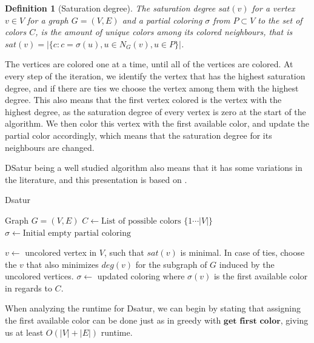 \documentclass[a4paper]{article}
\newtheorem{definition}{Definition}[section]
\begin{document}
\begin{definition}[Saturation degree]{\cite{Constructive}}
    The saturation degree $sat(v)$ for a vertex $v \in V$ for a graph $G =
    (V,E)$ and a partial coloring $\sigma$ from $P \subset V$ to the set of colors $C$, is the amount of unique colors among
    its colored neighbours, that is $sat(v) = |\{c  : c = \sigma(u), u \in N_G(v),u \in P  \}|$.
\end{definition}

The vertices are colored one at a time, until all of the vertices are colored.
At every step of the iteration, we identify the vertex that has the highest
saturation degree, and if there are ties we choose the vertex among them with
the highest degree. This also means that the first vertex colored is the vertex
with the highest degree, as the saturation degree of every vertex is zero at the
start of the algorithm. We then color this vertex with the first available
color, and update the partial color accordingly, which means that the saturation
degree for its neighbours are changed.

DSatur being a well studied
algorithm also means that it has some variations in the literature, and this
presentation is based on \cite{Constructive}.
\begin{algorithm}[H]
  \caption{Dsatur}
  \begin{algorithmic}[1]
      \REQUIRE Graph $G = (V,E)$
      \STATE $C \leftarrow \text{List of possible colors $\{1 \cdots |V| \}$ }$
      \STATE $\sigma \leftarrow \text{Initial empty partial coloring}$


        \STATE $v \leftarrow$ uncolored vertex in $V$, such that $sat(v)$ is
        minimal. In case of ties, choose the $v$ that also minimizes $deg(v)$
        for the subgraph of $G$ induced by the uncolored vertices.
        \STATE $\sigma \leftarrow$ updated coloring where $\sigma(v)$ is the first
        available color in regards to $C$.
      \ENDFOR
  \end{algorithmic}
\end{algorithm}
When analyzing the runtime for Dsatur, we can begin by stating that
assigning the first available color can be done just as in greedy with
$\textbf{get first color}$, giving us at least $O(|V|+|E|)$ runtime. 
\end{document}

